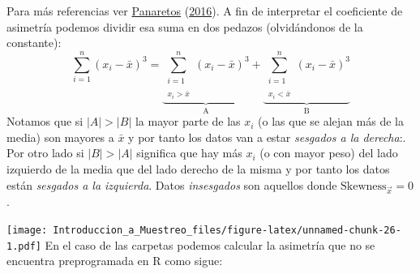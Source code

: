 \documentclass[
]{book}
\newenvironment{Shaded}{\begin{snugshade}}{\end{snugshade}}
\newcommand{\CommentTok}[1]{\textcolor[rgb]{0.56,0.35,0.01}{\textit{#1}}}
\newcommand{\DecValTok}[1]{\textcolor[rgb]{0.00,0.00,0.81}{#1}}
\newcommand{\FunctionTok}[1]{\textcolor[rgb]{0.00,0.00,0.00}{#1}}
\newcommand{\NormalTok}[1]{#1}
\newcommand{\OtherTok}[1]{\textcolor[rgb]{0.56,0.35,0.01}{#1}}
\newcommand{\SpecialCharTok}[1]{\textcolor[rgb]{0.00,0.00,0.00}{#1}}
\begin{document}
Para más referencias ver \protect\hyperlink{ref-panaretos2016statistics}{Panaretos} (\protect\hyperlink{ref-panaretos2016statistics}{2016}). A fin de interpretar el coeficiente de asimetría podemos dividir esa suma en dos pedazos (olvidándonos de la constante):
\[
\sum\limits_{i = 1}^{n} (x_i - \bar{x})^3 = \underbrace{\sum\limits_{\substack{i = 1 \\ \\ x_i > \bar{x}}}^{n} (x_i - \bar{x})^3}_{\text{A}} + \underbrace{\sum\limits_{\substack{i = 1 \\ \\ x_i < \bar{x}}}^{n} (x_i - \bar{x})^3}_{\text{B}} 
\]
Notamos que si \(|A| > |B|\) la mayor parte de las \(x_i\) (o las que se alejan más de la media) son mayores a \(\bar{x}\) y por tanto los datos van a estar \emph{sesgados a la derecha}:. Por otro lado si \(|B| > |A|\) significa que hay más \(x_i\) (o con mayor peso) del lado izquierdo de la media que del lado derecho de la misma y por tanto los datos están \emph{sesgados a la izquierda}. Datos \emph{insesgados} son aquellos donde \(\text{Skewness}_{\vec{x}} = 0\).

\texttt{[image: Introduccion\_a\_Muestreo\_files/figure-latex/unnamed-chunk-26-1.pdf]}
En el caso de las carpetas podemos calcular la asimetría que no se encuentra preprogramada en R como sigue:

\begin{Shaded}
\end{Shaded}
\end{document}
